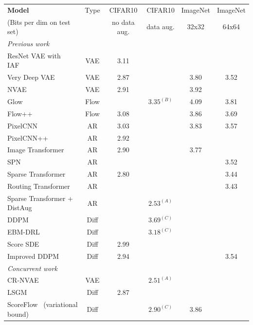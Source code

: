 \documentclass{article}
\begin{document}
\begin{table}[t]
\footnotesize
\begin{center}
%
\setlength{\tabcolsep}{4pt}
\begin{tabular}{lccccc}
%
\textbf{Model} & Type & CIFAR10 & CIFAR10 & ImageNet & ImageNet %
\\
(Bits per dim on test set)&  & no data aug. & data aug. & 32x32 & 64x64%
\\
\midrule
%
%
\textit{Previous work}\\
ResNet VAE with IAF~\citep{kingma2016improving} & VAE & 3.11 & \\
%
Very Deep VAE~\citep{child2020very} & VAE & 2.87 & & 3.80 & 3.52 \\
NVAE~\citep{vahdat2020nvae} & VAE & 2.91 & & 3.92 & \\
%
Glow~\citep{kingma2018glow} & Flow & & $3.35^{(B)}$ & 4.09 & 3.81 \\
Flow++~\citep{ho2019flow++} & Flow & 3.08 & & 3.86 & 3.69 \\
PixelCNN~\citep{van2016pixel} & AR & 3.03 & & 3.83 & 3.57\\
PixelCNN++~\citep{salimans2017pixelcnn++} & AR & 2.92 &\\
%
Image Transformer~\citep{parmar2018image} & AR & 2.90 & & 3.77\\
SPN ~\citep{menick2018generating} & AR & & & & 3.52 \\
Sparse Transformer~\citep{child2019generating}& AR &2.80 & & & 3.44 %
\\
Routing Transformer~\citep{roy2021efficient} & AR & & & & 3.43\\
Sparse Transformer + DistAug~\citep{jun2020distribution} & AR & & $2.53^{(A)}$ & & \\
%
DDPM~\citep{ho2020denoising} & Diff & & $3.69^{(C)}$ & & %
\\
EBM-DRL~\citep{gao2020learning} & Diff & & $3.18^{(C)}$ & & \\
Score SDE~\citep{song2020score} & Diff & 2.99 & & & %
\\
Improved DDPM~\citep{nichol2021improved} & Diff & 2.94 & & & 3.54 %
\\
\midrule
\textit{Concurrent work}\\
CR-NVAE \citep{sinha2021consistency} & VAE & & $2.51^{(A)}$ \\ 
LSGM~\citep{vahdat2021score} & Diff & 2.87\\
ScoreFlow~\citep{song2021maximum} (variational bound) & Diff & & $2.90^{(C)}$ & 3.86 & \\

\end{tabular}
\end{center}
\end{table}
\end{document}

